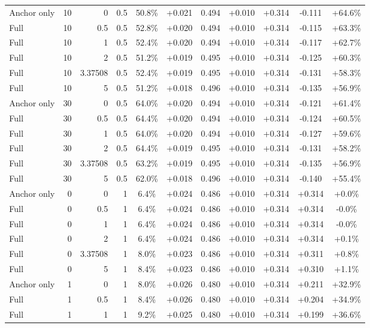 \begin{table}[htbp]
\begin{tabular}{lrrrccccccc}
Anchor only & 10 & 0 & 0.5 & 50.8\% & +0.021 & 0.494 & +0.010 & +0.314 & -0.111 & +64.6\% \\
Full & 10 & 0.5 & 0.5 & 52.8\% & +0.020 & 0.494 & +0.010 & +0.314 & -0.115 & +63.3\% \\
Full & 10 & 1 & 0.5 & 52.4\% & +0.020 & 0.494 & +0.010 & +0.314 & -0.117 & +62.7\% \\
Full & 10 & 2 & 0.5 & 51.2\% & +0.019 & 0.495 & +0.010 & +0.314 & -0.125 & +60.3\% \\
Full & 10 & 3.37508 & 0.5 & 52.4\% & +0.019 & 0.495 & +0.010 & +0.314 & -0.131 & +58.3\% \\
Full & 10 & 5 & 0.5 & 51.2\% & +0.018 & 0.496 & +0.010 & +0.314 & -0.135 & +56.9\% \\
Anchor only & 30 & 0 & 0.5 & 64.0\% & +0.020 & 0.494 & +0.010 & +0.314 & -0.121 & +61.4\% \\
Full & 30 & 0.5 & 0.5 & 64.4\% & +0.020 & 0.494 & +0.010 & +0.314 & -0.124 & +60.5\% \\
Full & 30 & 1 & 0.5 & 64.0\% & +0.020 & 0.494 & +0.010 & +0.314 & -0.127 & +59.6\% \\
Full & 30 & 2 & 0.5 & 64.4\% & +0.019 & 0.495 & +0.010 & +0.314 & -0.131 & +58.2\% \\
Full & 30 & 3.37508 & 0.5 & 63.2\% & +0.019 & 0.495 & +0.010 & +0.314 & -0.135 & +56.9\% \\
Full & 30 & 5 & 0.5 & 62.0\% & +0.018 & 0.496 & +0.010 & +0.314 & -0.140 & +55.4\% \\
Anchor only & 0 & 0 & 1 & 6.4\% & +0.024 & 0.486 & +0.010 & +0.314 & +0.314 & +0.0\% \\
Full & 0 & 0.5 & 1 & 6.4\% & +0.024 & 0.486 & +0.010 & +0.314 & +0.314 & -0.0\% \\
Full & 0 & 1 & 1 & 6.4\% & +0.024 & 0.486 & +0.010 & +0.314 & +0.314 & -0.0\% \\
Full & 0 & 2 & 1 & 6.4\% & +0.024 & 0.486 & +0.010 & +0.314 & +0.314 & +0.1\% \\
Full & 0 & 3.37508 & 1 & 8.0\% & +0.023 & 0.486 & +0.010 & +0.314 & +0.311 & +0.8\% \\
Full & 0 & 5 & 1 & 8.4\% & +0.023 & 0.486 & +0.010 & +0.314 & +0.310 & +1.1\% \\
Anchor only & 1 & 0 & 1 & 8.0\% & +0.026 & 0.480 & +0.010 & +0.314 & +0.211 & +32.9\% \\
Full & 1 & 0.5 & 1 & 8.4\% & +0.026 & 0.480 & +0.010 & +0.314 & +0.204 & +34.9\% \\
Full & 1 & 1 & 1 & 9.2\% & +0.025 & 0.480 & +0.010 & +0.314 & +0.199 & +36.6\% \\

\end{tabular}
\end{table}
